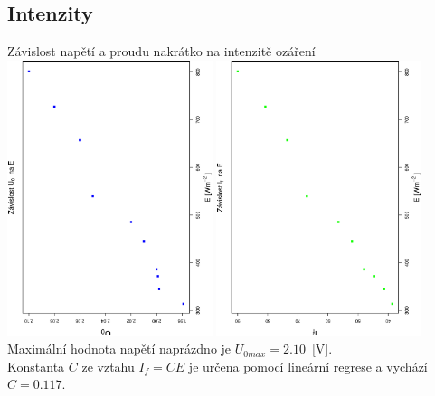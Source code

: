 \documentclass[10pt]{article}
\begin{document}
\subsection{Intenzity}
Závislost napětí a proudu nakrátko na intenzitě ozáření \\
\includegraphics[width=6cm,angle=270]{graf1.eps}
\includegraphics[width=6cm,angle=270]{graf2.eps} \\[1cm]

\noindent
Maximální hodnota napětí naprázdno je $U_{0max} = 2.10$~[V]. \\
Konstanta $C$ ze vztahu $I_f = CE$ je určena pomocí lineární regrese a vychází
$C = 0.117$.
\end{document}
